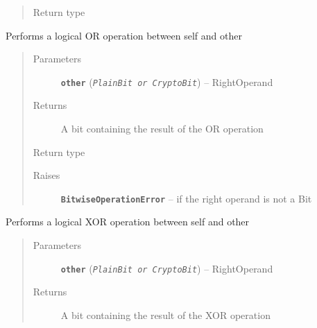 \documentclass[letterpaper,10pt,english]{sphinxmanual}
\begin{document}
\begin{fulllineitems}
\begin{fulllineitems}
\begin{quote}
\begin{description}
\item[{Return type}] \leavevmode
{\hyperref[datatypes.bits:datatypes.bits.Bit.CryptoBit]{}}

\end{description}\end{quote}

\end{fulllineitems}


\begin{fulllineitems}
\label{datatypes.bits:datatypes.bits.Bit.CryptoBit.OR}
Performs a logical OR operation between self and other
\begin{quote}\begin{description}
\item[{Parameters}] \leavevmode
\textbf{\texttt{other}} (\emph{\texttt{PlainBit or CryptoBit}}) -- RightOperand

\item[{Returns}] \leavevmode
A bit containing the result of the OR operation

\item[{Return type}] \leavevmode
{\hyperref[datatypes.bits:datatypes.bits.Bit.CryptoBit]{}}

\item[{Raises}] \leavevmode
\textbf{\texttt{BitwiseOperationError}} -- if the right operand is not a Bit

\end{description}\end{quote}

\end{fulllineitems}


\begin{fulllineitems}
\label{datatypes.bits:datatypes.bits.Bit.CryptoBit.XOR}
Performs a logical XOR operation between self and other
\begin{quote}\begin{description}
\item[{Parameters}] \leavevmode
\textbf{\texttt{other}} (\emph{\texttt{PlainBit or CryptoBit}}) -- RightOperand

\item[{Returns}] \leavevmode
A bit containing the result of the XOR operation


\end{description}
\end{quote}
\end{fulllineitems}
\end{fulllineitems}
\end{document}
